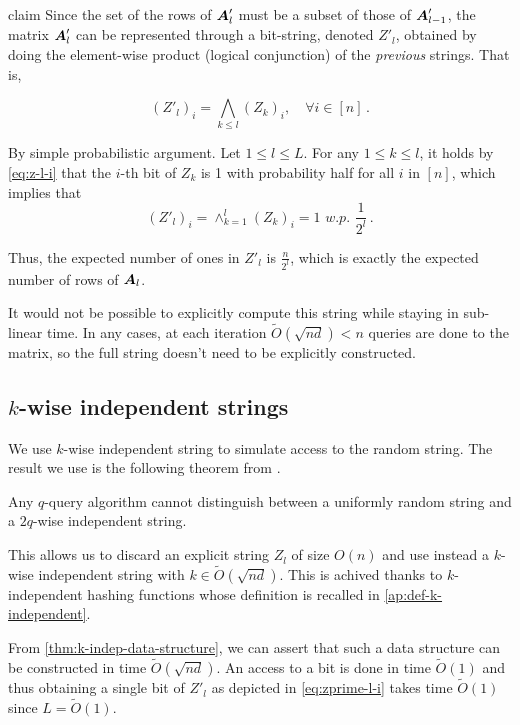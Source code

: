 \begin{theoremEnd}{claim}
    Since the set of the rows of $\boldsymbol A'_l$ must be a subset of those of $\boldsymbol A'_{l -
    1}$, the matrix $\boldsymbol A'_l$ can be represented through a bit-string, denoted $Z'_l$,
    obtained by doing the element-wise product (logical conjunction) of the
    \emph{previous}
    strings. That is,

    \begin{equation}\label{eq:zprime-l-i}
        (Z'_l)_i = \displaystyle\bigwedge_{k \leq l} (Z_k)_i, \quad \forall i \in [n] \, .
    \end{equation}
\end{theoremEnd}

\begin{proofEnd} By simple probabilistic argument. Let $1 \leq l \leq L$. For any
$1 \leq k \leq l$, it holds by \autoref{eq:z-l-i} that the $i$-th bit of  $Z_k$
is 1 with probability half for all $i$ in $[n]$, which implies that
$$
(Z'_l)_i = \wedge_{k=1}^l (Z_k)_i = 1 \textit{ w.p. } \frac{1}{2^l} \, .
$$

Thus, the expected number of ones in $Z'_l$ is $\frac{n}{2^l}$, which is exactly
the expected number of rows of $\boldsymbol A_l$.
\end{proofEnd}
It would not be possible to explicitly compute this string while staying in
sub-linear time. In any cases, at each iteration $\tilde O(\sqrt{nd}) < n$
queries are done to the matrix, so the full string doesn't need to be explicitly
constructed.


\subsection{$k$-wise independent strings}
We use $k$-wise independent string to simulate access to the random string. The
result we use is the following theorem from \cite{zhandry_secure_2015}.

\begin{theorem} \label{thm:q-query-alg}
    Any $q$-query algorithm cannot distinguish between a uniformly random string
    and a $2q$-wise independent string.
\end{theorem}

This allows us to discard an explicit string $Z_l$ of size $O(n)$ and use
instead a $k$-wise independent string with $k \in \tilde O(\sqrt{nd})$. This is
achived thanks to $k$-independent hashing functions whose definition is recalled
in \autoref{ap:def-k-independent}.

From \autoref{thm:k-indep-data-structure}, we can assert that such a data
structure can be constructed in time $\tilde{O}(\sqrt{nd})$. An access to a bit
is done in time $\tilde{O}(1)$ and thus obtaining a single bit of $Z'_l$ as
depicted in \autoref{eq:zprime-l-i} takes time $\tilde O (1)$ since $L = \tilde
O(1)$.

